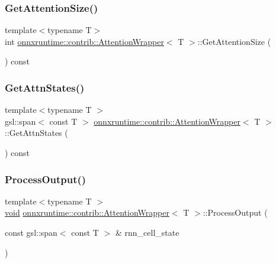 \subsubsection{\texorpdfstring{Get\+Attention\+Size()}{GetAttentionSize()}}
{\footnotesize\ttfamily template$<$typename T$>$ \\
int \mbox{\hyperlink{classonnxruntime_1_1contrib_1_1AttentionWrapper}{onnxruntime\+::contrib\+::\+Attention\+Wrapper}}$<$ T $>$\+::Get\+Attention\+Size (\begin{DoxyParamCaption}{ }\end{DoxyParamCaption}) const\hspace{0.3cm}{\ttfamily [inline]}}

\mbox{\label{classonnxruntime_1_1contrib_1_1AttentionWrapper_a667a0b3d4e6b0f917a024fc452ded468}} 
\subsubsection{\texorpdfstring{Get\+Attn\+States()}{GetAttnStates()}}
{\footnotesize\ttfamily template$<$typename T $>$ \\
gsl\+::span$<$ const T $>$ \mbox{\hyperlink{classonnxruntime_1_1contrib_1_1AttentionWrapper}{onnxruntime\+::contrib\+::\+Attention\+Wrapper}}$<$ T $>$\+::Get\+Attn\+States (\begin{DoxyParamCaption}{ }\end{DoxyParamCaption}) const}

\mbox{\label{classonnxruntime_1_1contrib_1_1AttentionWrapper_a49dfb4da39265819061ddb3824b79023}} 
\subsubsection{\texorpdfstring{Process\+Output()}{ProcessOutput()}}
{\footnotesize\ttfamily template$<$typename T $>$ \\
\mbox{\hyperlink{mlasi_8h_a88f941d423cb2a819b70a1358982b1a6}{void}} \mbox{\hyperlink{classonnxruntime_1_1contrib_1_1AttentionWrapper}{onnxruntime\+::contrib\+::\+Attention\+Wrapper}}$<$ T $>$\+::Process\+Output (\begin{DoxyParamCaption}\item[{const gsl\+::span$<$ const T $>$ \&}]{rnn\+\_\+cell\+\_\+state }\end{DoxyParamCaption})}


